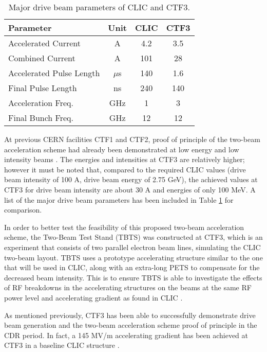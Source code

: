 \begin{table}[!htb]
\begin{center}
\begin{tabular}{l | c | c | c}
\textbf{Parameter}                & \textbf{Unit}    & \textbf{CLIC} & \textbf{CTF3} \\ \hline
    Accelerated Current      & A       & 4.2  & 3.5  \\
    Combined Current         & A       & 101  & 28   \\
    Accelerated Pulse Length & $\mu$s & 140  & 1.6  \\
    Final Pulse Length       & ns      & 240  & 140  \\
    Acceleration Freq.       & GHz     & 1    & 3    \\
    Final Bunch Freq.        & GHz     & 12   & 12   \\
\end{tabular}
\caption{Major drive beam parameters of CLIC and CTF3. \cite{CLIC:Concept}}
\label{tab:CLIC:Feasi2}
\end{center}
\end{table}

At previous CERN facilities CTF1 and CTF2, proof of principle of the two-beam acceleration scheme had already been demonstrated at low energy and low intensity beams \cite{Nuclear:CTF3}. The energies and intensities at CTF3 are relatively higher; however it must be noted that, compared to the required CLIC values (drive beam intensity of 100 A, drive beam energy of 2.75   GeV), the achieved values at CTF3 for drive beam intensity are about 30 A and energies of only 100  MeV. A list of the major drive beam parameters has been included in Table \ref{tab:CLIC:Feasi2} for comparison.

In order to better test the feasibility of this proposed two-beam acceleration scheme, the Two-Beam Test Stand (TBTS) \cite{Nuclear:CTF3} was constructed at CTF3, which is an experiment that consists of two parallel electron beam lines, simulating the CLIC two-beam layout. TBTS uses a prototype accelerating structure similar to the one that will be used in CLIC, along with an extra-long PETS to compensate for the decreased beam intensity. This is to ensure TBTS is able to investigate the effects of RF breakdowns in the accelerating structures on the beams at the same RF power level and accelerating gradient as found in CLIC \cite{Nuclear:CTF3}.

As mentioned previously, CTF3 has been able to successfully demonstrate drive beam generation and the two-beam acceleration scheme proof of principle in the CDR period. In fact, a 145 MV/m accelerating gradient has been achieved at CTF3 in a baseline CLIC structure \cite{CLIC:Concept}.

